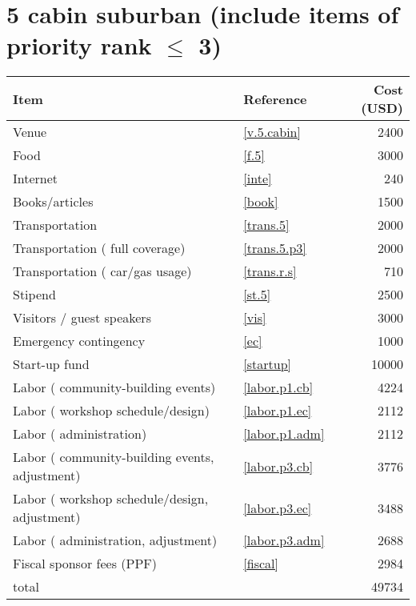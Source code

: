 \section*{5 cabin suburban (include items of priority rank $\leq$ 3)}
\begin{center}
\begin{tabular}{llr}
Item & Reference & Cost (USD) \\ \hline
Venue & \ref{v.5.cabin} & 2400 \\
Food & \ref{f.5} & 3000 \\
Internet & \ref{inte} & 240 \\
Books/articles & \ref{book} & 1500 \\
Transportation & \ref{trans.5} & 2000 \\
Transportation ( full coverage) & \ref{trans.5.p3} & 2000 \\
Transportation ( car/gas usage) & \ref{trans.r.s} & 710 \\
Stipend & \ref{st.5} & 2500 \\
Visitors / guest speakers & \ref{vis} & 3000 \\
Emergency contingency & \ref{ec} & 1000 \\
Start-up fund & \ref{startup} & 10000 \\
Labor ( community-building events) & \ref{labor.p1.cb} & 4224 \\
Labor ( workshop schedule/design) & \ref{labor.p1.ec} & 2112 \\
Labor ( administration) & \ref{labor.p1.adm} & 2112 \\
Labor ( community-building events, adjustment) & \ref{labor.p3.cb} & 3776 \\
Labor ( workshop schedule/design, adjustment) & \ref{labor.p3.ec} & 3488 \\
Labor ( administration, adjustment) & \ref{labor.p3.adm} & 2688 \\
Fiscal sponsor fees (PPF) & \ref{fiscal} & 2984 \\ \hline
total &  & 49734
\end{tabular}
\end{center}
\newpage

